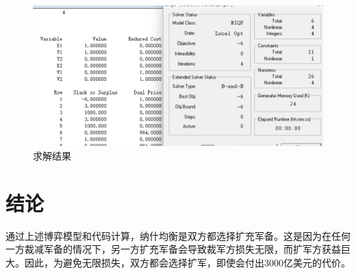 \documentclass[12pt, a4paper, oneside]{ctexart}
\begin{document}
\begin{figure}[htbp]
    \centering
    \includegraphics[scale = 0.4]{image.png}
    \caption{求解结果}
\end{figure} 
\section*{结论}
通过上述博弈模型和代码计算，纳什均衡是双方都选择扩充军备。这是因为在任何一方裁减军备的情况下，另一方扩充军备会导致裁军方损失无限，而扩军方获益巨大。因此，为避免无限损失，双方都会选择扩军，即使会付出3000亿美元的代价。
\end{document}
